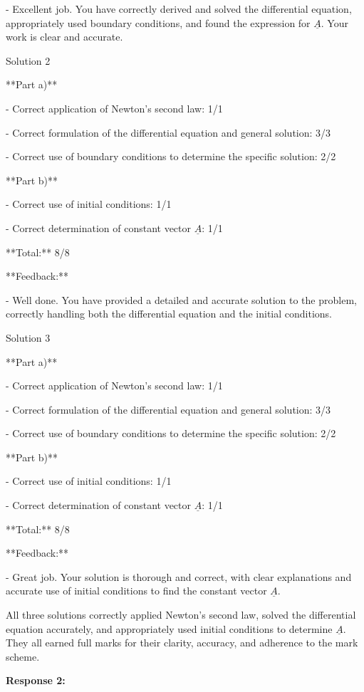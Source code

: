 \documentclass[a4paper,11pt]{article}
\begin{document}
- Excellent job. You have correctly derived and solved the differential equation, appropriately used boundary conditions, and found the expression for \( \underline{A} \). Your work is clear and accurate.

Solution 2

**Part a)**

- Correct application of Newton's second law: 1/1

- Correct formulation of the differential equation and general solution: 3/3

- Correct use of boundary conditions to determine the specific solution: 2/2

**Part b)**

- Correct use of initial conditions: 1/1

- Correct determination of constant vector \( \underline{A} \): 1/1

**Total:** 8/8

**Feedback:** 

- Well done. You have provided a detailed and accurate solution to the problem, correctly handling both the differential equation and the initial conditions.

Solution 3

**Part a)**

- Correct application of Newton's second law: 1/1

- Correct formulation of the differential equation and general solution: 3/3

- Correct use of boundary conditions to determine the specific solution: 2/2

**Part b)**

- Correct use of initial conditions: 1/1

- Correct determination of constant vector \( \underline{A} \): 1/1

**Total:** 8/8

**Feedback:** 

- Great job. Your solution is thorough and correct, with clear explanations and accurate use of initial conditions to find the constant vector \( \underline{A} \).

All three solutions correctly applied Newton's second law, solved the differential equation accurately, and appropriately used initial conditions to determine \( \underline{A} \). They all earned full marks for their clarity, accuracy, and adherence to the mark scheme.

\bigskip
\textbf{Response 2:}
\end{document}
